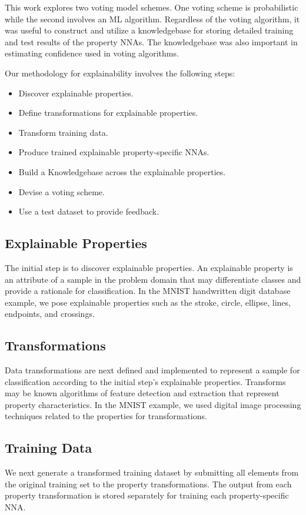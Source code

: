 \documentclass[conference]{IEEEtran}
\begin{document}
This work explores two voting model schemes.  One voting scheme is probabilistic while the second involves an ML algorithm.  Regardless of the voting algorithm, it was useful to construct and utilize a knowledgebase for storing detailed training and test results of the property NNAs.  The knowledgebase was also important in estimating confidence used in voting algorithms. 
 
Our methodology for explainability involves the following steps:
\begin{itemize}
\item Discover explainable properties.
\item Define transformations for explainable properties.
\item Transform training data.
\item Produce trained explainable property-specific NNAs.
\item Build a Knowledgebase across the explainable properties.
\item Devise a voting scheme.
\item Use a test dataset to provide feedback.
\end{itemize}

\subsection{Explainable Properties}
The initial step is to discover explainable properties.  An explainable property is an attribute of a sample in the problem domain that may differentiate classes and provide a rationale for classification.  In the MNIST handwritten digit database example, we pose explainable properties such as the stroke, circle, ellipse, lines, endpoints, and crossings.

\subsection{Transformations}
Data transformations are next defined and implemented to represent a sample for classification according to the initial step's explainable properties.  Transforms may be known algorithms of feature detection and extraction that represent property characteristics.  In the MNIST example, we used digital image processing techniques related to the properties for transformations.  

\subsection{Training Data} 
We next generate a transformed training dataset by submitting all elements from the original training set to the property transformations.  The output from each property transformation is stored separately for training each property-specific NNA. 
\end{document}
